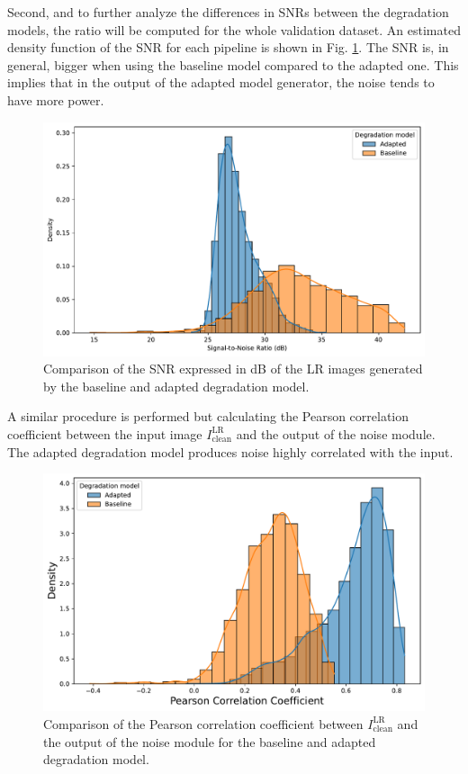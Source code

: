         Second, and to further analyze the differences in SNRs between the degradation models, the ratio will be computed for the whole validation dataset.
        An estimated density function of the SNR for each pipeline is shown in Fig. \ref{fig:5-source-noise-SNR}.
        The SNR is, in general, bigger when using the baseline model compared to the adapted one.
        This implies that in the output of the adapted model generator, the noise tends to have more power. 

        \begin{figure}[H]
            \centering
            \includegraphics[width=\textwidth]{Includes/5-source-noise-SNR.pdf}
            \caption{Comparison of the SNR expressed in dB of the LR images generated by the baseline and adapted degradation model.}
            \label{fig:5-source-noise-SNR}
        \end{figure}


        A similar procedure is performed but calculating the Pearson correlation coefficient between the input image $I^{\text{LR}}_{\text{clean}}$ and the output of the noise module. The adapted degradation model produces noise highly correlated with the input.


        \begin{figure}[H]
            \centering
            \includegraphics[width=\textwidth]{Includes/5-source-noise-correlation.pdf}
            \caption{Comparison of the Pearson correlation coefficient between $I^{\text{LR}}_{\text{clean}}$ and the output of the noise module for the baseline and adapted degradation model.}
            \label{fig:5-source-noise-correlation}
        \end{figure}

